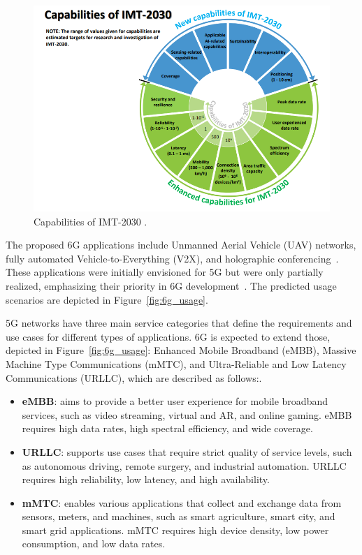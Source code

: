 \begin{figure}[H]
    \centering
    \includegraphics[width=0.8\linewidth]{figures/capabilities 6g}
    \caption[Capabilities of IMT-2030]{Capabilities of IMT-2030 \cite{ITU_2160-0}.}
    \label{fig:6g_capab}
\end{figure}

The proposed 6G applications include Unmanned Aerial Vehicle (UAV) networks, fully automated Vehicle-to-Everything (V2X), and holographic conferencing~\cite{6G_ITU}.
These applications were initially envisioned for 5G but were only partially realized, emphasizing their priority in 6G development~\cite{6G_ITU}.
The predicted usage scenarios are depicted in Figure~\ref{fig:6g_usage}.

5G networks have three main service categories that define the requirements and use cases for different types of applications.
6G is expected to extend those, depicted in Figure~\ref{fig:6g_usage}: Enhanced Mobile Broadband (eMBB), Massive Machine Type Communications (mMTC), and Ultra-Reliable and Low Latency Communications (URLLC), which are described as follows:.
\begin{itemize}
    \item \textbf{eMBB}: aims to provide a better user experience for mobile broadband services, such as video streaming, virtual and AR, and online gaming.
    eMBB requires high data rates, high spectral efficiency, and wide coverage.
    \item \textbf{URLLC}: supports use cases that require strict quality of service levels, such as autonomous driving, remote surgery, and industrial automation.
    URLLC requires high reliability, low latency, and high availability.
    \item \textbf{mMTC}: enables various applications that collect and exchange data from sensors, meters, and machines, such as smart agriculture, smart city, and smart grid applications.
    mMTC requires high device density, low power consumption, and low data rates.
\end{itemize}

